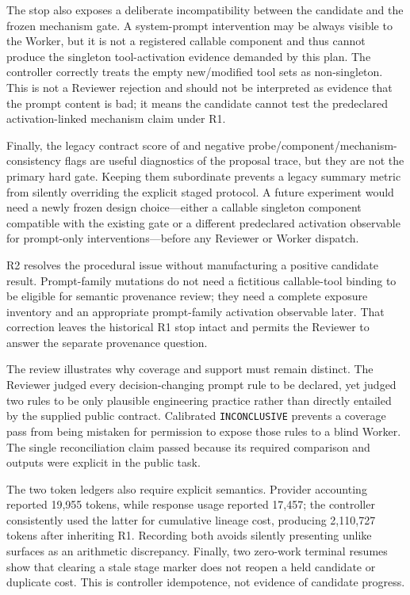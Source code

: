 The stop also exposes a deliberate incompatibility between the candidate and
the frozen mechanism gate. A system-prompt intervention may be always visible
to the Worker, but it is not a registered callable component and thus cannot
produce the singleton tool-activation evidence demanded by this plan. The
controller correctly treats the empty new/modified tool sets as
non-singleton. This is not a Reviewer rejection and should not be interpreted
as evidence that the prompt content is bad; it means the candidate cannot test
the predeclared activation-linked mechanism claim under R1.

Finally, the legacy contract score of \HoldingsProposalLegacyContract{} and
negative probe/component/mechanism-consistency flags are useful diagnostics of
the proposal trace, but they are not the primary hard gate. Keeping them
subordinate prevents a legacy summary metric from silently overriding the
explicit staged protocol. A future experiment would need a newly frozen design
choice---either a callable singleton component compatible with the existing
gate or a different predeclared activation observable for prompt-only
interventions---before any Reviewer or Worker dispatch.

R2 resolves the procedural issue without manufacturing a positive candidate
result. Prompt-family mutations do not need a fictitious callable-tool binding
to be eligible for semantic provenance review; they need a complete exposure
inventory and an appropriate prompt-family activation observable later. That
correction leaves the historical R1 stop intact and permits the Reviewer to
answer the separate provenance question.

The review illustrates why coverage and support must remain distinct. The
Reviewer judged every decision-changing prompt rule to be declared, yet judged
two rules to be only plausible engineering practice rather than directly
entailed by the supplied public contract. Calibrated
\texttt{INCONCLUSIVE} prevents a coverage pass from being mistaken for
permission to expose those rules to a blind Worker. The single reconciliation
claim passed because its required comparison and outputs were explicit in the
public task.

The two token ledgers also require explicit semantics. Provider accounting
reported 19,955 tokens, while response usage reported 17,457; the controller
consistently used the latter for cumulative lineage cost, producing 2,110,727
tokens after inheriting R1. Recording both avoids silently presenting unlike
surfaces as an arithmetic discrepancy. Finally, two zero-work terminal resumes
show that clearing a stale stage marker does not reopen a held candidate or
duplicate cost. This is controller idempotence, not evidence of candidate
progress.

